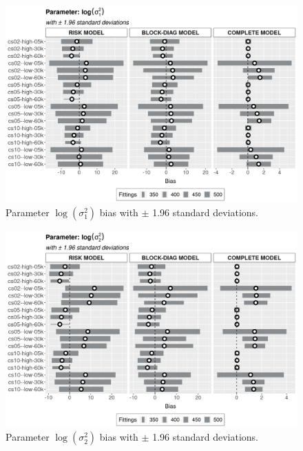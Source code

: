 \documentclass[a4paper,12pt]{article}
\begin{document}
\begin{figure}[H]
 \centering
 \includegraphics[width=\linewidth]{../../THESIS/thesis/figures/bias2plotsd-7.png}
 \vspace{-0.75cm}
 \caption{Parameter \(\log(\sigma_{1}^{2})\) bias with \(\pm\) 1.96
   standard deviations.}
 \label{fig:biassdlogs2_1}
\end{figure}

\begin{figure}[H]
 \centering
 \includegraphics[width=\linewidth]{../../THESIS/thesis/figures/bias2plotsd-8.png}
 \vspace{-0.75cm}
 \caption{Parameter \(\log(\sigma_{2}^{2})\) bias with \(\pm\) 1.96
   standard deviations.}
 \label{fig:biassdlogs2_2}
\end{figure}
\end{document}
